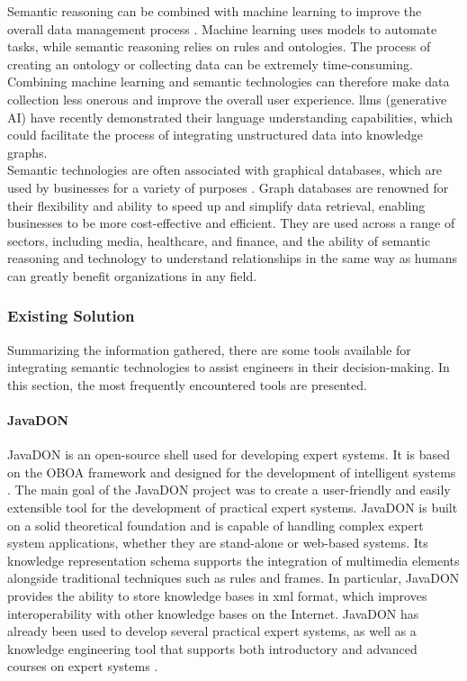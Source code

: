             Semantic reasoning can be combined with machine learning to improve the overall data management process \cite{pan2024unifying}. Machine learning uses models to automate tasks, while semantic reasoning relies on rules and ontologies. The process of creating an ontology or collecting data can be extremely time-consuming. Combining machine learning and semantic technologies can therefore make data collection less onerous and improve the overall user experience. \acrfull{llms} (generative AI) have recently demonstrated their language understanding capabilities, which could facilitate the process of integrating unstructured data into knowledge graphs.\\
        
            Semantic technologies are often associated with graphical databases, which are used by businesses for a variety of purposes \cite{eshach2003case}. Graph databases are renowned for their flexibility and ability to speed up and simplify data retrieval, enabling businesses to be more cost-effective and efficient. They are used across a range of sectors, including media, healthcare, and finance, and the ability of semantic reasoning and technology to understand relationships in the same way as humans can greatly benefit organizations in any field.\\
        
        \subsubsection{Existing Solution\label{sec:exonto}}
        Summarizing the information gathered, there are some tools available for integrating semantic technologies to assist engineers in their decision-making. In this section, the most frequently encountered tools are presented.
        
            \paragraph{JavaDON}
            JavaDON is an open-source shell used for developing expert systems. It is based on the OBOA framework and designed for the development of intelligent systems \cite{jovanovic2005achieving}. The main goal of the JavaDON project was to create a user-friendly and easily extensible tool for the development of practical expert systems. JavaDON is built on a solid theoretical foundation and is capable of handling complex expert system applications, whether they are stand-alone or web-based systems. Its knowledge representation schema supports the integration of multimedia elements alongside traditional techniques such as rules and frames. In particular, JavaDON provides the ability to store knowledge bases in \acrshort{xml} format, which improves interoperability with other knowledge bases on the Internet. JavaDON has already been used to develop several practical expert systems, as well as a knowledge engineering tool that supports both introductory and advanced courses on expert systems \cite{tomic2006javadon}.
        
